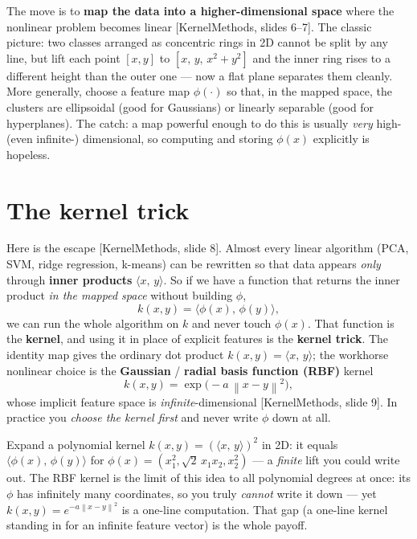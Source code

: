 \documentclass[11pt]{article}
\newcommand{\norm}[1]{\left\lVert #1 \right\rVert}
\newcommand{\inner}[2]{\langle #1,\,#2\rangle}
\newcommand{\deck}[1]{\textsf{\small[#1]}}
\begin{document}
The move is to \textbf{map the data into a higher-dimensional space} where the
nonlinear problem becomes linear \deck{KernelMethods, slides 6--7}. The classic
picture: two classes arranged as concentric rings in 2D cannot be split by any
line, but lift each point $[x,y]$ to $[x,\,y,\,x^2+y^2]$ and the inner ring rises
to a different height than the outer one --- now a flat plane separates them
cleanly. More generally, choose a feature map $\phi(\cdot)$ so that, in the mapped
space, the clusters are ellipsoidal (good for Gaussians) or linearly separable
(good for hyperplanes). The catch: a map powerful enough to do this is usually
\emph{very} high- (even infinite-) dimensional, so computing and storing
$\phi(x)$ explicitly is hopeless.

\section{The kernel trick}

Here is the escape \deck{KernelMethods, slide 8}. Almost every linear algorithm
(PCA, SVM, ridge regression, k-means) can be rewritten so that data appears
\emph{only} through \textbf{inner products} $\inner{x}{y}$. So if we have a
function that returns the inner product \emph{in the mapped space} without
building $\phi$,
\[
k(x,y) = \inner{\phi(x)}{\phi(y)},
\]
we can run the whole algorithm on $k$ and never touch $\phi(x)$. That function is
the \textbf{kernel}, and using it in place of explicit features is the
\textbf{kernel trick}. The identity map gives the ordinary dot product
$k(x,y)=\inner{x}{y}$; the workhorse nonlinear choice is the \textbf{Gaussian} /
\textbf{radial basis function (RBF)} kernel
\[
k(x,y) = \exp\!\big(-a\,\norm{x-y}^2\big),
\]
whose implicit feature space is \emph{infinite}-dimensional \deck{KernelMethods,
slide 9}. In practice you \emph{choose the kernel first} and never write $\phi$
down at all.

\begin{notebox}
Expand a polynomial kernel $k(x,y)=(\inner{x}{y})^2$ in 2D: it equals
$\inner{\phi(x)}{\phi(y)}$ for $\phi(x)=(x_1^2,\sqrt2\,x_1x_2,x_2^2)$ --- a
\emph{finite} lift you could write out. The RBF kernel is the limit of this idea
to all polynomial degrees at once: its $\phi$ has infinitely many coordinates, so
you truly \emph{cannot} write it down --- yet $k(x,y)=e^{-a\norm{x-y}^2}$ is a
one-line computation. That gap (a one-line kernel standing in for an infinite
feature vector) is the whole payoff.
\end{notebox}
\end{document}
